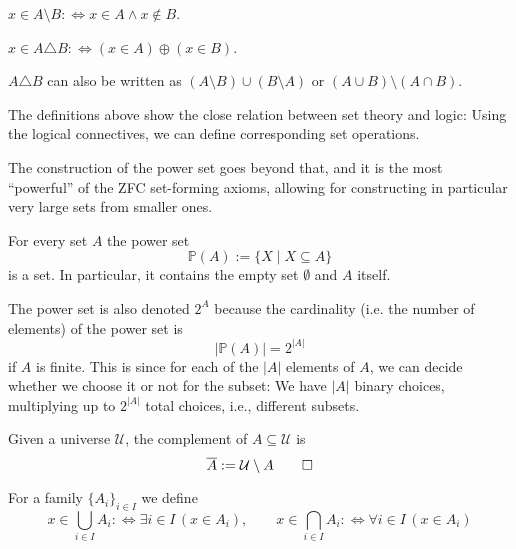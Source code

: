 \begin{definition}[Difference]\label{def:difference}
\(x\in A\setminus B :\Longleftrightarrow x\in A\wedge x\notin B\).
\end{definition}

\begin{definition}\label{def:symmetric-diff}
\(x\in A\triangle B :\Longleftrightarrow (x\in A)\oplus(x\in B)\).
\end{definition}
\(A\triangle B\) can also be written as \((A\setminus B)\cup(B\setminus A)\) or \((A\cup B)\setminus(A\cap B)\).


The definitions above show the close relation between set theory and logic: Using the logical connectives, we can define corresponding set operations.

The construction of the power set goes beyond that, and it is the most ``powerful'' of the ZFC set-forming axioms, allowing for constructing in particular very large sets from smaller ones. 
\begin{axiom}\label{ax:power-set}
For every set \(A\) the power set
\[
\mathbb{P}(A):=\{X\mid X\subseteq A\}
\]
is a set.
In particular, it contains the empty set \(\emptyset\) and \(A\) itself.
\end{axiom}
The power set is also denoted $2^A$ because the cardinality (i.e. the number of elements) of the power set is
$$
|\mathbb{P}(A)|=2^{|A|}
$$
if $A$ is finite. 
This is since for each of the $|A|$ elements of $A$, we can decide whether we choose it or not for the subset: We have $|A|$ binary choices, multiplying up to $2^{|A|}$ total choices, i.e., different subsets.

\begin{definition}[Complement]\label{def:complement}
Given a universe \(\mathcal{U}\), the complement of \(A\subseteq\mathcal{U}\) is 
\[
\overline{A}:=\mathcal{U}\setminus A \qedhere
\]
\end{definition}



For a family \(\{A_i\}_{i\in I}\) we define
\[
x\in\bigcup_{i\in I}A_i :\Longleftrightarrow \exists i\in I\,(x\in A_i),\qquad
x\in\bigcap_{i\in I}A_i :\Longleftrightarrow \forall i\in I\,(x\in A_i)
\]


